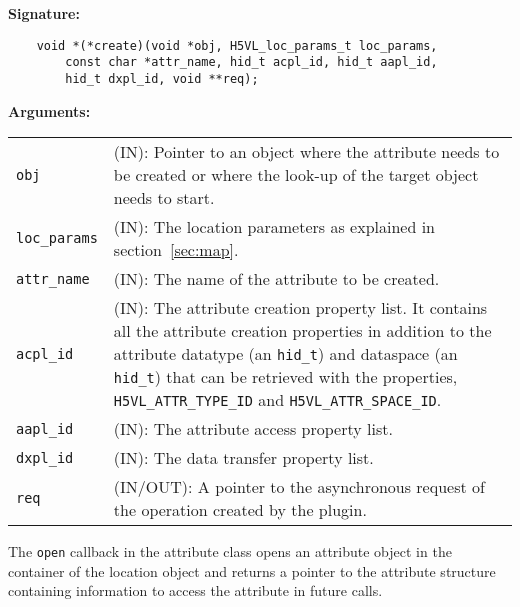 \begin{mdframed}[style=bgbox]
\textbf{Signature:}
\begin{lstlisting}
    void *(*create)(void *obj, H5VL_loc_params_t loc_params, 
        const char *attr_name, hid_t acpl_id, hid_t aapl_id, 
        hid_t dxpl_id, void **req);
\end{lstlisting}

\textbf{Arguments:}\\
\begin{tabular}{l p{10cm}}
  \texttt{obj} & (IN): Pointer to an object where the attribute needs
  to be created or where the look-up of the target object needs to
  start.\\
  \texttt{loc\_params} & (IN): The location parameters as explained in
  section~\ref{sec:map}.\\
  \texttt{attr\_name} & (IN): The name of the attribute to be created.\\
  \texttt{acpl\_id} & (IN): The attribute creation property list. It contains
  all the attribute creation properties in addition to the attribute
  datatype (an \texttt{hid\_t}) and dataspace (an \texttt{hid\_t}) that can
  be retrieved with the properties, \texttt{H5VL\_ATTR\_TYPE\_ID} and
  \texttt{H5VL\_ATTR\_SPACE\_ID}.\\
  \texttt{aapl\_id} & (IN): The attribute access property list.\\
  \texttt{dxpl\_id} & (IN): The data transfer property list.\\
  \texttt{req} & (IN/OUT): A pointer to the asynchronous request of the
  operation created by the plugin.\\
\end{tabular}
\end{mdframed}

The \texttt{open} callback in the attribute class opens an
attribute object in the container of the location object and returns a
pointer to the attribute structure containing information to access
the attribute in future calls. \bigskip


